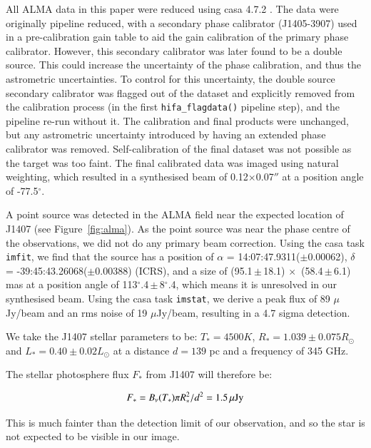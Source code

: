 \documentclass[twocolumn]{aa} %
\begin{document}
All ALMA data in this paper were reduced using {\sc casa} 4.7.2 \citep{McMUllin07}.
%
The data were originally pipeline reduced, with a secondary phase calibrator (J1405-3907) used in a pre-calibration gain table to aid the gain calibration of the primary phase calibrator.
%
However, this secondary calibrator was later found to be a double source.
%
This could increase the uncertainty of the phase calibration, and thus the astrometric uncertainties.
%
To control for this uncertainty, the double source secondary calibrator was flagged out of the dataset and explicitly removed from the calibration process (in the first \texttt{hifa\_flagdata()} pipeline step), and the pipeline re-run without it.
%
The calibration and final products were unchanged, but any astrometric uncertainty introduced by having an extended phase calibrator was removed.
%
Self-calibration of the final dataset was not possible as the target was too faint.
%
The final calibrated data was imaged using natural weighting, which resulted in a synthesised beam of 0.12$\times$0.07$''$ at a position angle of -77.5$^\circ$.
%

A point source was detected in the ALMA field near the expected location of J1407 (see Figure~\ref{fig:alma}).
%
As the point source was near the phase centre of the observations, we did not do any primary beam correction.
%
Using the {\sc casa} task \texttt{imfit}, we find that the source has a position of $\alpha$ = 14:07:47.9311($\pm$0.00062), $\delta$ = -39:45:43.26068($\pm$0\arcsec.00388) (ICRS), and a size of (95.1\,$\pm$\,18.1) $\times$\, (58.4\,$\pm$\,6.1)\,mas at a position angle of 113$^{\circ}$.4\,$\pm$\,8$^{\circ}$.4, which means it is unresolved in our synthesised beam.
%
Using the {\sc casa} task \texttt{imstat}, we derive a peak flux of 89 $\mu$Jy/beam and an rms noise of 19 $\mu$Jy/beam, resulting in a 4.7 sigma detection.

We take the J1407 stellar parameters to be: $T_* = 4500 K$, $R_* = 1.039\pm 0.075 R_\odot$ and $L_* = 0.40\pm0.02 L_\odot$ at a distance $d = 139$ pc and a frequency of 345 GHz.

The stellar photosphere flux $F_*$ from J1407 will therefore be:

    $$F_* = B_\nu(T_*) \pi R_*^2/d^2 = 1.5\,{\rm \mu Jy}$$
    
This is much fainter than the detection limit of our observation, and so the star is not expected to be visible in our image.
\end{document}
